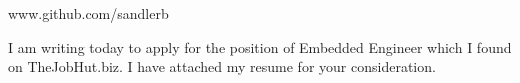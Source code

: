 \documentclass{cover_letter}
\begin{document}


            {www.github.com/sandlerb}

\dividingline{}




\par I am writing today to apply for the position of Embedded Engineer which I
found on TheJobHut.biz.  I have attached my resume for your consideration.
\end{document}

